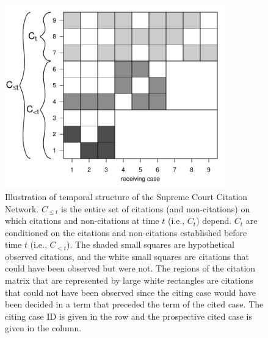 \documentclass{cup-pan}
\begin{document}
\begin{figure}[bt]
\centering
\includegraphics[width = 0.85\textwidth ]{daggish.pdf}
\caption{Illustration of temporal structure of the Supreme Court Citation Network. $C_{\leq t}$ is the entire set of citations (and non-citations) on which citations and non-citations at time $t$ (i.e., $C_t$) depend. $C_t$ are conditioned on the citations and non-citations established before time $t$ (i.e., $C_{< t}$). The shaded small squares are hypothetical observed citations, and the white small squares are citations that could have been observed but were not. The regions of the citation matrix that are represented by large white rectangles are citations that could not have been observed since the citing case would have been decided in a term that preceded the term of the cited case. The citing case ID is given in the row and the prospective cited case is given in the column. }
\label{fig:ctergm}
\end{figure}
\end{document}

